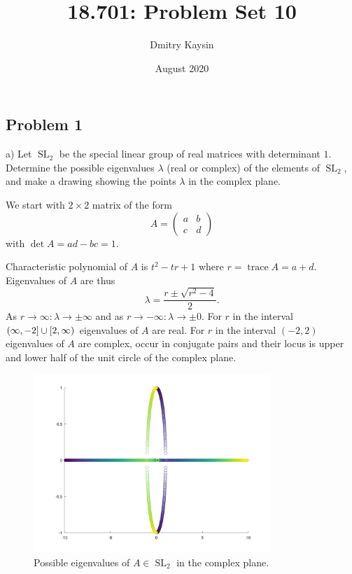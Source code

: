 \documentclass{article}
\title{18.701: Problem Set 10}
\author{Dmitry Kaysin}
\date{August 2020}
\theoremstyle{definition}
\newcommand{\trace}{\operatorname{trace}}
\newcommand{\SL}{\operatorname{SL}}
\begin{document}
\maketitle 


\subsection*{Problem 1}

\begin{tcolorbox}
a) Let $\SL_2$ be the special linear group of real matrices with determinant $1$.
Determine the possible eigenvalues $\lambda$ (real or complex) of the elements of $\SL_2$, and make a drawing showing the points $\lambda$ in the complex plane.
\end{tcolorbox}

We start with $2 \times 2$ matrix of the form
\[
    A =
    \begin{pmatrix}
        a & b \\
        c & d
    \end{pmatrix}
\]
with $\det A = ad - bc = 1$.

Characteristic polynomial of $A$ is $t^2 - tr + 1$ where $r = \trace A = a+d$.
Eigenvalues of $A$ are thus
\[
    \lambda = \frac{r \pm \sqrt{r^2-4}}{2}.
\]
As $r \to \infty : \lambda \to \pm \infty$ and
as $r \to -\infty : \lambda \to \pm 0$.
For $r$ in the interval $(\-\infty, -2] \cup [2, \infty)$ eigenvalues of $A$ are real.
For $r$ in the interval $(-2, 2)$ eigenvalues of $A$ are complex, occur in conjugate pairs and their locus is upper and lower half of the unit circle of the complex plane.

\begin{figure}[h]
    \caption{Possible eigenvalues of $A \in \SL_2$ in the complex plane.}
    \centering
    \includegraphics[width=0.8\textwidth]{ps10p1}
\end{figure}
\end{document}
